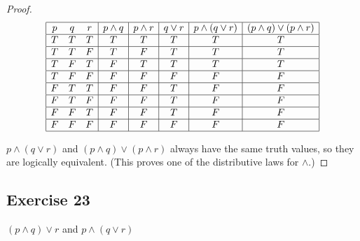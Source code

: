 \documentclass[14pt]{extarticle}
\begin{document}
\begin{proof}
    $$
        \begin{array}{|ccc|c|c|c|c|c|}
            \hline
            p & q & r & p \wedge q & p \wedge r & q \vee r & p \wedge (q \vee r) & (p \wedge q) \vee (p \wedge r) \\
            \hline
            T & T & T & T          & T          & T        & T                   & T                              \\
            \hline
            T & T & F & T          & F          & T        & T                   & T                              \\
            \hline
            T & F & T & F          & T          & T        & T                   & T                              \\
            \hline
            T & F & F & F          & F          & F        & F                   & F                              \\
            \hline
            F & T & T & F          & F          & T        & F                   & F                              \\
            \hline
            F & T & F & F          & F          & T        & F                   & F                              \\
            \hline
            F & F & T & F          & F          & T        & F                   & F                              \\
            \hline
            F & F & F & F          & F          & F        & F                   & F                              \\
            \hline
        \end{array}
    $$

    $p \wedge (q \vee r)$ and $(p \wedge q) \vee (p \wedge r)$ always have the same truth values, so they are logically equivalent. (This proves one of the distributive laws for $\wedge$.)
\end{proof}

\subsection{Exercise 23}
$(p \wedge q) \vee r$ and $p \wedge (q \vee r)$
\end{document}
